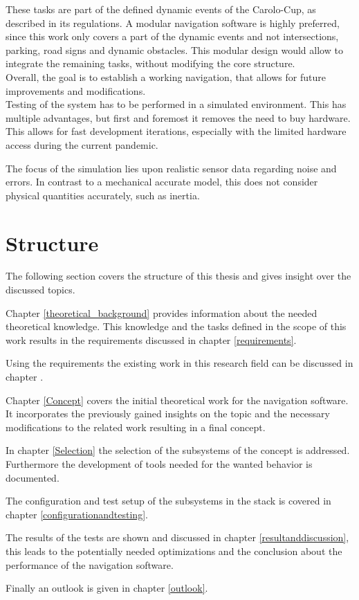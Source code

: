 These tasks are part of the defined dynamic events of the Carolo-Cup, as described in its regulations\cite{carolocup}. A modular navigation software is highly preferred, since this work only covers a part of the dynamic events and not intersections, parking, road signs and dynamic obstacles. This modular design would allow to integrate the remaining tasks, without modifying the core structure.\\

Overall, the goal is to establish a working navigation, that allows for future improvements and modifications.\\

Testing of the system has to be performed in a simulated environment. This has multiple advantages, but first and foremost it removes the need to buy hardware. This allows for fast development iterations, especially with the limited hardware access during the current pandemic.


The focus of the simulation lies upon realistic sensor data regarding noise and errors. In contrast to a mechanical accurate model, this does not consider physical quantities accurately, such as inertia.


\section{Structure}
The following section covers the structure of this thesis and gives insight over the discussed topics.

Chapter \ref{theoretical_background} provides information about the needed theoretical knowledge. This knowledge and the tasks defined in the scope of this work results in the requirements discussed in chapter \ref{requirements}.

Using the requirements the existing work in this research field can be discussed in chapter \cite{relatedwork}.

Chapter \ref{Concept} covers the initial theoretical work for the navigation software. It incorporates the previously gained insights on the topic and the necessary modifications to the related work resulting in a final concept.

In chapter \ref{Selection} the selection of the subsystems of the concept is addressed. Furthermore the development of tools needed for the wanted behavior is documented.

The configuration and test setup of the subsystems in the stack is covered in chapter \ref{configurationandtesting}.


The results of the tests are shown and discussed in chapter \ref{resultanddiscussion}, this leads to the potentially needed optimizations and the conclusion about the performance of the navigation software.

Finally an outlook is given in chapter \ref{outlook}.
